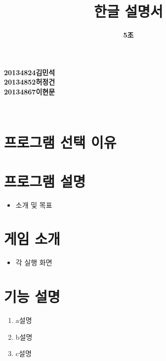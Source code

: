 \documentclass[a4paper, 11pt]{article}
\title{\textbf{\Huge오목 한글 설명서}}
\author{\textbf{\LARGE5조}}
\begin{document}
	
	\maketitle
	
	\vspace{6cm}
	\begin{center}
		\textbf{\large20134824김민석}\\
		\textbf{\large20134852허정건}\\
		\textbf{\large20134867이현문}\\
	\end{center}
	
	
	
	
	\maketitle
	\newpage
	\thispagestyle{empty}        
	\mbox{}
		
	\begin{center} 
		\textbf{}\\
	\end{center}
	\vspace{0.5cm}
\section{프로그램 선택 이유}
	\vspace{0.5cm}
	\section{프로그램 설명}
	\begin{itemize}
		\item 소개 및 목표
	\end{itemize}
	
	\section{게임 소개}
		\begin{itemize}
		\item 각 실행 화면
	\end{itemize}

	
	\section{기능 설명}
	\begin{enumerate}
		\item a설명
		\item b설명
		\item c설명
	\end{enumerate}
	
\end{document}
